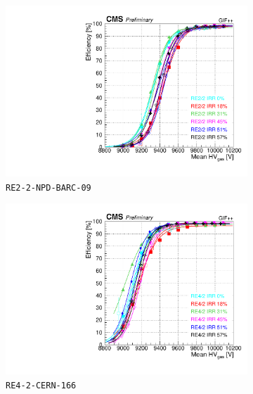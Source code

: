 	\begin{figure}[H]
    	\begin{subfigure}{0.5\linewidth}
			\centering
    		\includegraphics[width = \linewidth]{fig/chapt5/efficiency_vs_HVgas_RE2_2-IRR.pdf}
        	\caption{\label{fig:GIFpp_eff_vs_HVgas:A} \texttt{RE2-2-NPD-BARC-09}}
    	\end{subfigure}
    	\begin{subfigure}{0.5\linewidth}
			\centering
    		\includegraphics[width = \linewidth]{fig/chapt5/efficiency_vs_HVgas_RE4_2-IRR.pdf}
        	\caption{\label{fig:GIFpp_eff_vs_HVgas:B} \texttt{RE4-2-CERN-166}}
    	\end{subfigure}
    	\begin{subfigure}{0.5\linewidth}
			\centering

\end{subfigure}
\end{figure}
